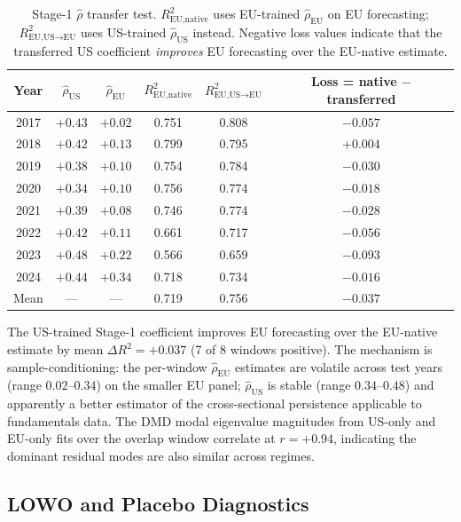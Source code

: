 \documentclass[11pt,a4paper]{article}
\begin{document}
\begin{table}[H]
\centering
\caption{Stage-1 $\hat\rho$ transfer test. $R^2_{\text{EU,native}}$ uses EU-trained $\hat\rho_{\text{EU}}$ on EU forecasting; $R^2_{\text{EU,US}\to\text{EU}}$ uses US-trained $\hat\rho_{\text{US}}$ instead. Negative loss values indicate that the transferred US coefficient \emph{improves} EU forecasting over the EU-native estimate.}
\label{tab:uk_eu_rho_transfer}
\small
\begin{tabular}{cccccc}
\toprule
Year & $\hat\rho_{\text{US}}$ & $\hat\rho_{\text{EU}}$ & $R^2_{\text{EU,native}}$ & $R^2_{\text{EU,US}\to\text{EU}}$ & Loss = native $-$ transferred \\
\midrule
2017 & $+0.43$ & $+0.02$ & 0.751 & 0.808 & $-0.057$ \\
2018 & $+0.42$ & $+0.13$ & 0.799 & 0.795 & $+0.004$ \\
2019 & $+0.38$ & $+0.10$ & 0.754 & 0.784 & $-0.030$ \\
2020 & $+0.34$ & $+0.10$ & 0.756 & 0.774 & $-0.018$ \\
2021 & $+0.39$ & $+0.08$ & 0.746 & 0.774 & $-0.028$ \\
2022 & $+0.42$ & $+0.11$ & 0.661 & 0.717 & $-0.056$ \\
2023 & $+0.48$ & $+0.22$ & 0.566 & 0.659 & $-0.093$ \\
2024 & $+0.44$ & $+0.34$ & 0.718 & 0.734 & $-0.016$ \\
\midrule
Mean & --- & --- & 0.719 & 0.756 & $-0.037$ \\
\bottomrule
\end{tabular}
\end{table}

The US-trained Stage-1 coefficient improves EU forecasting over the EU-native estimate by mean $\Delta R^2 = +0.037$ (7 of 8 windows positive). The mechanism is sample-conditioning: the per-window $\hat\rho_{\text{EU}}$ estimates are volatile across test years (range $0.02$--$0.34$) on the smaller EU panel; $\hat\rho_{\text{US}}$ is stable (range $0.34$--$0.48$) and apparently a better estimator of the cross-sectional persistence applicable to fundamentals data. The DMD modal eigenvalue magnitudes from US-only and EU-only fits over the overlap window correlate at $r = +0.94$, indicating the dominant residual modes are also similar across regimes.

\subsection{LOWO and Placebo Diagnostics}
\end{document}
